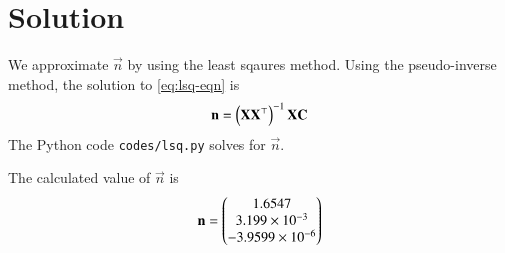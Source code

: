\documentclass[journal,12pt,twocolumn]{IEEEtran}
\begin{document}
\section{Solution}
We approximate $\vec{n}$ by using the least sqaures method. 
Using the pseudo-inverse method, the solution to \eqref{eq:lsq-eqn} 
is
\begin{align}
    \boldsymbol{\mathbf{n}} = \left(\boldsymbol{\mathbf{XX}}^\top\right)^{-1}\boldsymbol{\mathbf{X}}\boldsymbol{\mathbf{C}}
\end{align}
The Python code \texttt{codes/lsq.py} solves for $\vec{n}$.

The calculated value of $\vec{n}$ is
\begin{align}
    \boldsymbol{\mathbf{n}} = \begin{pmatrix}1.6547\\3.199\times10^{-3}\\-3.9599\times10^{-6}\end{pmatrix}
    \label{eq:opt-theta}
\end{align}

%
\end{document}
